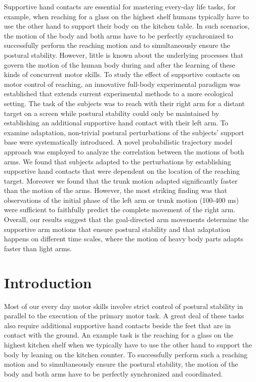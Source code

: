 

Supportive hand contacts are essential for mastering every-day life tasks, for 
example, when reaching for a glass on the highest shelf humans typically have to 
use the other hand to support their body on the kitchen table. In such 
scenarios, the motion of the body and both arms have to be perfectly 
synchronized to successfully perform the reaching motion and to simultaneously 
ensure the postural stability. However, little is known about the underlying 
processes that govern the motion of the human body during and after the learning 
of these kinds of concurrent motor skills. To study the effect of supportive 
contacts on motor control of reaching, an innovative full-body experimental 
paradigm was established that extends current experimental methods to a more 
ecological setting. The task of the subjects was to reach with their right arm 
for a distant target on a screen while postural stability could only be 
maintained by establishing an additional supportive hand contact with their left 
arm. To examine adaptation, non-trivial postural perturbations of the subjects' 
support base were systematically introduced. A novel probabilistic trajectory 
model approach was employed to analyze the correlation between the motions of 
both arms. We found that subjects adapted to the perturbations by establishing 
supportive hand contacts that were dependent on the location of the reaching 
target. Moreover we found that the trunk motion adapted significantly faster 
than the motion of the arms. However, the most striking finding was that 
observations of the initial phase of the left arm or trunk motion (100-400 ms) 
were sufficient to faithfully predict the complete movement of the right arm. 
Overall, our results suggest that the goal-directed arm movements determine the 
supportive arm motions that ensure postural stability and that adaptation 
happens on different time scales, where the motion of heavy body parts adapts 
faster than light arms. 

\section{Introduction}
Most of our every day motor skills involve strict control of postural stability 
in parallel to the execution of the primary motor task. A great deal of these 
tasks also require additional supportive hand contacts beside the feet that are in contact with the ground. An example task is the reaching for a glass on 
the highest kitchen shelf when we typically have to use the other hand to 
support the body by leaning on the kitchen counter. To successfully perform such a reaching 
motion and to simultaneously ensure the postural stability, the motion of the 
body and both arms have to be perfectly synchronized and coordinated.

